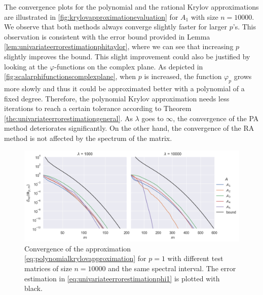 The convergence plots for the polynomial and the rational Krylov approximations are
illustrated in \autoref{fig:krylovapproximationevaluation} for $A_1$ with size $n=10000$.
We observe that both methods always converge slightly faster for larger $p$'s.
This observation is consistent with the error bound provided in Lemma
\ref{lem:univariateerrorestimationphitaylor}, where we can see that increasing $p$ slightly
improves the bound. This slight improvement could also be justified by looking at the
$\varphi$-functions on the complex plane. As depicted in
\autoref{fig:scalarphifunctionscomplexplane}, when $p$ is increased, the
function $\varphi_p$ grows more slowly and thus it could be approximated better with a
polynomial of a fixed degree. Therefore, the polynomial Krylov approximation needs
less iterations to reach a certain tolerance according to Theorem
\ref{the:univariateerrorestimationgeneral}.
As $\lambda$ goes to $\infty$, the convergence of the PA method deteriorates significantly.
On the other hand, the convergence of the RA method is not affected by the spectrum
of the matrix.


\begin{figure}[h]
    \centering
    \includegraphics[width=\textwidth]{img/krylovapproximation/cnvg_matrices_PA_n10000.png}
    \caption{Convergence of the approximation \eqref{eq:polynomialkrylovapproximation}
    for $p=1$ with different test matrices of size $n=10000$ and the same spectral interval.
    The error estimation in \eqref{eq:univariateerrorestimationphi1} is plotted with black.}
    \label{fig:krylovapproximationmatrices}
\end{figure}

